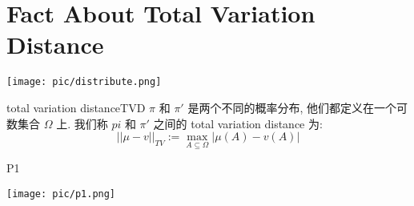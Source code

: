 \documentclass[lang=cn]{elegantbook}
\begin{document}
\section{Fact About Total Variation Distance}
\begin{center}
  \texttt{[image: pic/distribute.png]}
\end{center}

\begin{definition}{total variation distance}{TVD}
  $\pi$ 和 $\pi'$ 是两个不同的概率分布, 他们都定义在一个可数集合 $\Omega$ 上. 我们称 $pi$ 和 $\pi'$ 之间的 total variation distance 为:
  \[
    ||\mu - v||_{TV} := \max_{A\subseteq \Omega} |\mu(A) - v(A)|
  \]
\end{definition}

\begin{proposition}{}{P1}
  \begin{center}
    \texttt{[image: pic/p1.png]}
  \end{center}
\end{proposition}
\end{document}
